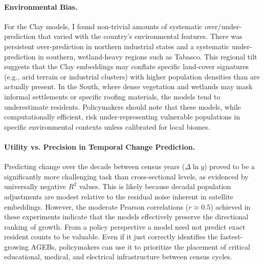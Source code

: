 \documentclass[12pt,letterpaper]{article}
\begin{document}
\paragraph{Environmental Bias.}
For the Clay models, I found non-trivial amounts of systematic over/under-prediction that varied with the country's environmental features. There was persistent over-prediction in northern industrial states and a systematic under-prediction in southern, wetland-heavy regions such as Tabasco. This regional tilt suggests that the Clay embeddings may conflate specific land-cover signatures (e.g., arid terrain or industrial clusters) with higher population densities than are actually present. In the South, where dense vegetation and wetlands may mask informal settlements or specific roofing materials, the models tend to underestimate residents. Policymakers should note that these models, while computationally efficient, risk under-representing vulnerable populations in specific environmental contexts unless calibrated for local biomes.

\paragraph{Utility vs. Precision in Temporal Change Prediction.}
Predicting change over the decade between census years ($\Delta \ln y$) proved to be a significantly more challenging task than cross-sectional levels, as evidenced by universally negative $R^2$ values.  This is likely because decadal population adjustments are modest relative to the residual noise inherent in satellite embeddings. However, the moderate Pearson correlations ($r \approx 0.5$) achieved in these experiments indicate that the models effectively preserve the directional ranking of growth. From a policy perspective a model need not predict exact resident counts to be valuable. Even if it just correctly identifies the fastest-growing AGEBs, policymakers can use it to prioritize the placement of critical educational, medical, and electrical infrastructure between census cycles.
\end{document}
